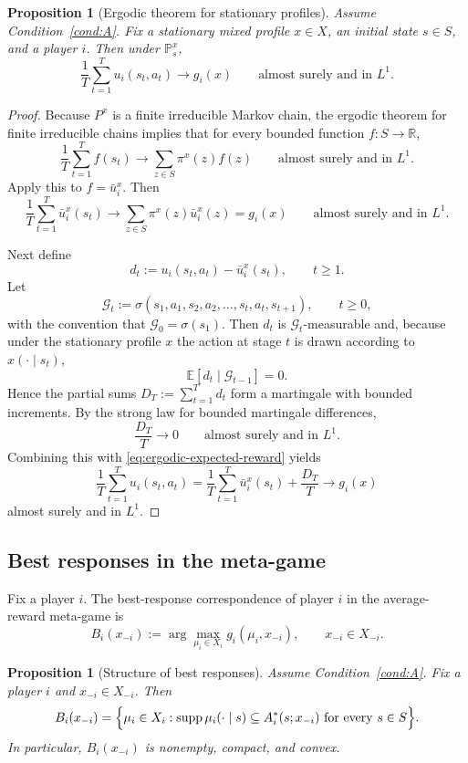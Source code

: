 \documentclass[11pt]{article}
\newtheorem{proposition}[theorem]{Proposition}
\theoremstyle{definition}
\newcommand{\E}{\mathbb{E}}
\newcommand{\Prob}{\mathbb{P}}
\newcommand{\R}{\mathbb{R}}
\newcommand{\1}{\mathbf{1}}
\DeclareMathOperator{\supp}{supp}
\begin{document}
\begin{proposition}[Ergodic theorem for stationary profiles]\label{prop:ergodic}
Assume Condition~\ref{cond:A}. Fix a stationary mixed profile $x\in X$, an initial state $s\in S$, and a player $i$. Then under $\Prob_s^x$,
\[
\frac1T\sum_{t=1}^{T}u_i(s_t,a_t)\longrightarrow g_i(x)
\qquad\text{almost surely and in }L^1.
\]
\end{proposition}

\begin{proof}
Because $P^x$ is a finite irreducible Markov chain, the ergodic theorem for finite irreducible chains implies that for every bounded function $f:S\to\R$,
\[
\frac1T\sum_{t=1}^{T}f(s_t)\longrightarrow\sum_{z\in S}\pi^x(z)f(z)
\qquad\text{almost surely and in }L^1.
\]
Apply this to $f=\bar u_i^x$. Then
\begin{equation}\label{eq:ergodic-expected-reward}
\frac1T\sum_{t=1}^{T}\bar u_i^x(s_t)\longrightarrow \sum_{z\in S}\pi^x(z)\bar u_i^x(z)=g_i(x)
\qquad\text{almost surely and in }L^1.
\end{equation}

Next define
\[
d_t:=u_i(s_t,a_t)-\bar u_i^x(s_t),\qquad t\ge1.
\]
Let
\[
\mathcal G_t:=\sigma(s_1,a_1,s_2,a_2,\dots,s_t,a_t,s_{t+1}),\qquad t\ge0,
\]
with the convention that $\mathcal G_0=\sigma(s_1)$. Then $d_t$ is $\mathcal G_t$-measurable and, because under the stationary profile $x$ the action at stage $t$ is drawn according to $x(\cdot\mid s_t)$,
\[
\E[d_t\mid \mathcal G_{t-1}]=0.
\]
Hence the partial sums $D_T:=\sum_{t=1}^{T}d_t$ form a martingale with bounded increments. By the strong law for bounded martingale differences,
\[
\frac{D_T}{T}\longrightarrow 0
\qquad\text{almost surely and in }L^1.
\]
Combining this with \eqref{eq:ergodic-expected-reward} yields
\[
\frac1T\sum_{t=1}^{T}u_i(s_t,a_t)
=\frac1T\sum_{t=1}^{T}\bar u_i^x(s_t)+\frac{D_T}{T}
\longrightarrow g_i(x)
\]
almost surely and in $L^1$.
\end{proof}

\subsection{Best responses in the meta-game}

Fix a player $i$. The best-response correspondence of player $i$ in the average-reward meta-game is
\[
B_i(x_{-i}):=\arg\max_{\mu_i\in X_i} g_i(\mu_i,x_{-i}),\qquad x_{-i}\in X_{-i}.
\]

\begin{proposition}[Structure of best responses]\label{prop:best-response-structure}
Assume Condition~\ref{cond:A}. Fix a player $i$ and $x_{-i}\in X_{-i}$. Then
\begin{equation}\label{eq:best-response-product}
B_i(x_{-i})=
\Bigl\{\mu_i\in X_i:\supp\mu_i(\cdot\mid s)\subseteq A_i^*(s;x_{-i})\text{ for every }s\in S\Bigr\}.
\end{equation}
In particular, $B_i(x_{-i})$ is nonempty, compact, and convex.
\end{proposition}
\end{document}
